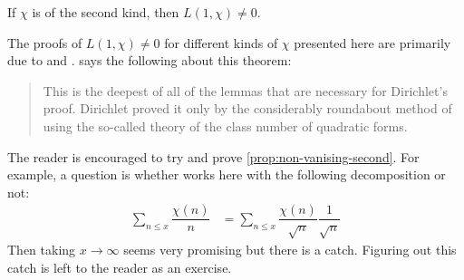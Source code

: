 \documentclass[elemannt.tex]{subfile}
\begin{document}
		\begin{proposition}\label{prop:non-vanising-second}
			If $\chi$ is of the second kind, then $L(1,\chi)\neq0$.
		\end{proposition}
	The proofs of $L(1, \chi)\neq0$ for different kinds of $\chi$ presented here are primarily due to \textcite[Chapters 6]{apostol_1976} and \textcite[Theorems 150-151]{landau_1969}. \textcite[pp. 121, Theorem 152]{landau_1969} says the following about this theorem:
		\begin{quote}
			This is the deepest of all of the lemmas that are necessary for Dirichlet's proof. Dirichlet proved it only by the considerably roundabout method of using the so-called theory of the class number of quadratic forms.
		\end{quote}
	 The reader is encouraged to try and prove \autoref{prop:non-vanising-second}. For example, a question is whether  works here with the following decomposition or not:
		\begin{align*}
			\sum_{n\leq x}\dfrac{\chi(n)}{n}
				& = \sum_{n\leq x}\dfrac{\chi(n)}{\sqrt{n}}\dfrac{1}{\sqrt{n}}
		\end{align*}
	Then taking $x\to\infty$ seems very promising but there is a catch. Figuring out this catch is left to the reader as an exercise.
\end{document}

